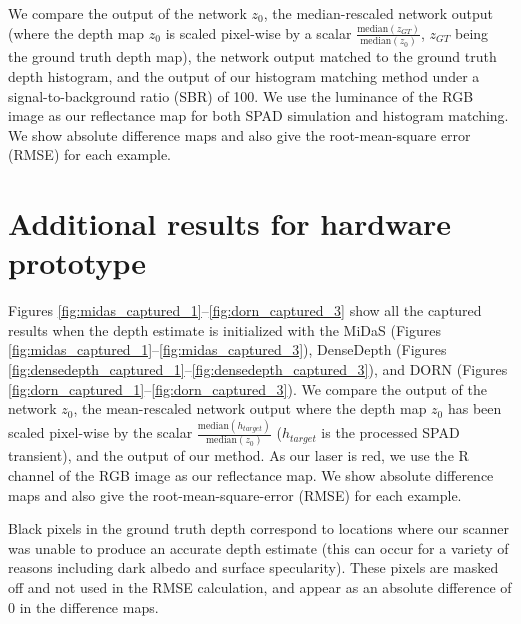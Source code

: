 \documentclass[runningheads]{llncs}
\begin{document}
We compare the output of the network $z_0$, the
median-rescaled network output (where the depth map $z_0$ is scaled pixel-wise by a
scalar $\frac{\text{median}(z_{GT})}{\text{median}(z_0)}$, $z_{GT}$ being the
ground truth depth map), the network output matched to the ground truth depth histogram, and the output of
our histogram matching method under a signal-to-background ratio (SBR) of 100.
We use the luminance of the RGB image as our reflectance map
for both SPAD simulation and histogram matching.
We show absolute difference maps and also give
the root-mean-square error (RMSE) for each example.

\newpage


\clearpage
\section{Additional results for hardware prototype}
Figures \ref{fig:midas_captured_1}--\ref{fig:dorn_captured_3} show all the
captured results when the depth estimate is initialized with the MiDaS
\cite{Lasinger:2019} (Figures \ref{fig:midas_captured_1}--\ref{fig:midas_captured_3}),
DenseDepth (Figures \ref{fig:densedepth_captured_1}--\ref{fig:densedepth_captured_3}),
and DORN (Figures \ref{fig:dorn_captured_1}--\ref{fig:dorn_captured_3}). We compare
the output of the network $z_0$, the mean-rescaled network output where the
depth map $z_0$ has been scaled pixel-wise by the scalar
$\frac{\text{median}(h_{target})}{\text{median}(z_0)}$ ($h_{target}$ is the
processed SPAD transient), and the output of our method. As our laser is red, we
use the R channel of the RGB image as our reflectance map. We show absolute
difference maps and also give the root-mean-square-error (RMSE) for each
example.

Black pixels in the ground truth depth correspond to locations where our scanner
was unable to produce an accurate depth estimate (this can occur for a variety
of reasons including dark albedo and surface specularity). These pixels are masked off and not used in the RMSE
calculation, and appear as an absolute difference of 0 in the difference maps.

\newpage



\clearpage 

{\small


}
\end{document}
